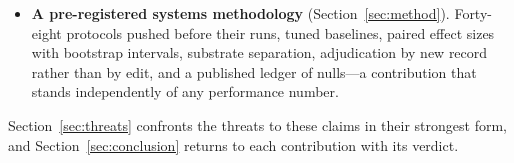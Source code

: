 \begin{itemize}
        (Section~\ref{sec:eval-live}). A replica-only ordinal check that
        recorded a disagreement, a valid 24-hour soak with two of four
        hypotheses failed, a real trace driving the real cluster, and a
        three-knob live plane on which the published controller lost, the
        corrected controller won at iso-fairness, and the obvious damper
        failed.
  \item \textbf{A pre-registered systems methodology}
        (Section~\ref{sec:method}). Forty-eight protocols pushed before
        their runs, tuned baselines, paired effect sizes with bootstrap
        intervals, substrate separation, adjudication by new record rather
        than by edit, and a published ledger of nulls---a contribution that
        stands independently of any performance number.
\end{itemize}

Section~\ref{sec:threats} confronts the threats to these claims in their
strongest form, and Section~\ref{sec:conclusion} returns to each
contribution with its verdict.
